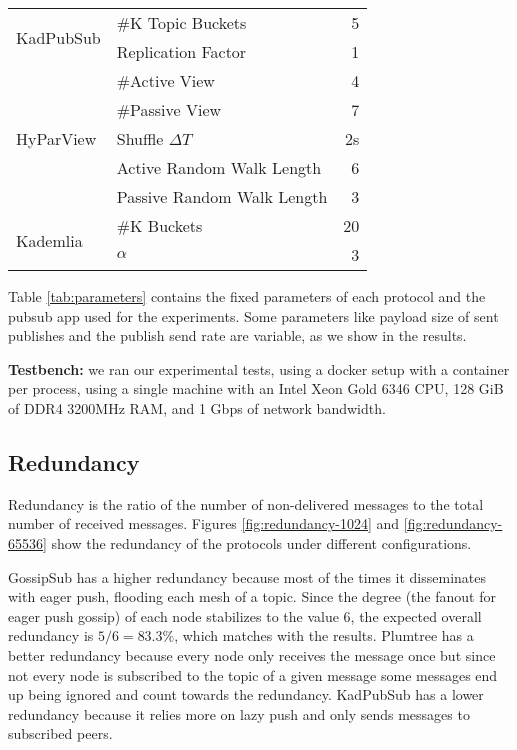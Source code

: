 \documentclass[sigconf]{acmart}
\begin{document}
\begin{table}[]
{\begin{tabular}{|l|l|r|}
    \multirow{2}{*}{KadPubSub} & \#K Topic Buckets          & 5                 \\
                               & Replication Factor         & 1                 \\ \hline
    \multirow{5}{*}{HyParView} & \#Active View              & 4                 \\
                               & \#Passive View             & 7                 \\
                               & Shuffle $\Delta T$         & 2s                \\
                               & Active Random Walk Length  & 6                 \\
                               & Passive Random Walk Length & 3                 \\ \hline
    \multirow{2}{*}{Kademlia}  & \#K Buckets                & 20                \\
                               & $\alpha$                   & 3                 \\ \hline
    \end{tabular}%
    }
    \end{table}

Table \ref{tab:parameters} contains the fixed parameters of each protocol and the pubsub app used for the experiments. Some parameters like payload size of sent publishes and the publish send rate are variable, as we show in the results.

\textbf{Testbench:} we ran our experimental tests, using a docker setup with a container per process, using a single machine with an Intel Xeon Gold 6346 CPU, 128 GiB of DDR4 3200MHz RAM, and 1 Gbps of network bandwidth. 



\subsection{Redundancy}
Redundancy is the ratio of the number of non-delivered messages to the total number of received messages. Figures \ref{fig:redundancy-1024} and \ref{fig:redundancy-65536} show the redundancy of the protocols under different configurations. 

GossipSub has a higher redundancy because most of the times it disseminates with eager push, flooding each mesh of a topic. Since the degree (the fanout for eager push gossip) of each node stabilizes to the value 6, the expected overall redundancy is $5 / 6 = 83.3\%$, which matches with the results.
Plumtree has a better redundancy because every node only receives the message once but since not every node is subscribed to the topic of a given message some messages end up being ignored and count towards the redundancy. KadPubSub has a lower redundancy because it relies more on lazy push and only sends messages to subscribed peers.
\end{document}
